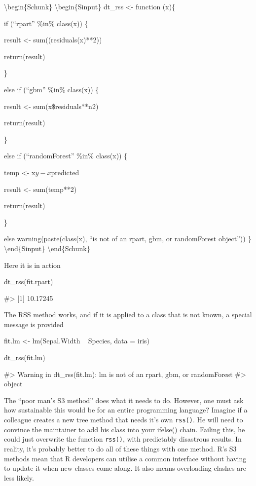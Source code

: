 \textbackslash{}begin\{Schunk\} \textbackslash{}begin\{Sinput\} dt\_rss
\textless{}- function (x)\{

if (``rpart'' \%in\% class(x)) \{

result \textless{}- sum((residuals(x)**2))

return(result)

\}

else if (``gbm'' \%in\% class(x)) \{

result \textless{}- sum(x\$residuals**n2)

return(result)

\}

else if (``randomForest'' \%in\% class(x)) \{

temp \textless{}- x\(y - x\)predicted

result \textless{}- sum(temp**2)

return(result)

\}

else warning(paste(class(x), ``is not of an rpart, gbm, or randomForest
object'')) \} \textbackslash{}end\{Sinput\}
\textbackslash{}end\{Schunk\}

Here it is in action

\begin{Schunk}
\begin{Sinput}
dt_rss(fit.rpart)
\end{Sinput}
\begin{Soutput}
#> [1] 10.17245
\end{Soutput}
\end{Schunk}

The RSS method works, and if it is applied to a class that is not known,
a special message is provided

\begin{Schunk}
\begin{Sinput}
fit.lm <- lm(Sepal.Width ~ Species, data = iris)

dt_rss(fit.lm)
\end{Sinput}
\begin{Soutput}
#> Warning in dt_rss(fit.lm): lm is not of an rpart, gbm, or randomForest
#> object
\end{Soutput}
\end{Schunk}

The ``poor man's S3 method'' does what it needs to do. However, one must
ask how sustainable this would be for an entire programming language?
Imagine if a colleague creates a new tree method that needs it's own
\texttt{rss()}. He will need to convince the maintainer to add his class
into your ifelse() chain. Failing this, he could just overwrite the
function \texttt{rss()}, with predictably disastrous results. In
reality, it's probably better to do all of these things with one method.
R's S3 methods mean that R developers can utilise a common interface
without having to update it when new classes come along. It also means
overloading clashes are less likely.

